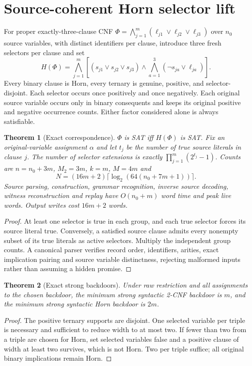 \documentclass[11pt]{article}
\newtheorem{theorem}{Theorem}
\begin{document}
\section{Source-coherent Horn selector lift}
For proper exactly-three-clause CNF $\Phi=\bigwedge_{j=1}^{m}(\ell_{j1}\vee\ell_{j2}\vee\ell_{j3})$ over $n_0$ source variables, with distinct identifiers per clause, introduce three fresh selectors per clause and set
\[
H(\Phi)=\bigwedge_{j=1}^{m}\left[
(s_{j1}\vee s_{j2}\vee s_{j3})\wedge
\bigwedge_{a=1}^{3}(\neg s_{ja}\vee\ell_{ja})\right].
\]
Every binary clause is Horn, every ternary is genuine, positive, and selector-disjoint. Each selector occurs once positively and once negatively. Each original source variable occurs only in binary consequents and keeps its original positive and negative occurrence counts. Either factor considered alone is always satisfiable.
\begin{theorem}[Exact correspondence]
$\Phi$ is SAT iff $H(\Phi)$ is SAT. Fix an original-variable assignment $\alpha$ and let $t_j$ be the number of true source literals in clause $j$. The number of selector extensions is exactly $\prod_{j=1}^{m}(2^{t_j}-1)$. Counts are $n=n_0+3m$, $M_2=3m$, $k=m$, $M=4m$ and
\[
N=(16m+2)\lceil\log_2(64(n_0+7m+1))\rceil.
\]
Source parsing, construction, grammar recognition, inverse source decoding, witness reconstruction and replay have $O(n_0+m)$ word time and peak live words. Output writes cost $16m+2$ words.
\end{theorem}
\begin{proof}
At least one selector is true in each group, and each true selector forces its source literal true. Conversely, a satisfied source clause admits every nonempty subset of its true literals as active selectors. Multiply the independent group counts. A canonical parser verifies record order, identifiers, arities, exact implication pairing and source variable distinctness, rejecting malformed inputs rather than assuming a hidden promise.
\end{proof}
\begin{theorem}[Exact strong backdoors]
Under raw restriction and all assignments to the chosen backdoor, the minimum strong syntactic 2-CNF backdoor is $m$, and the minimum strong syntactic Horn backdoor is $2m$.
\end{theorem}
\begin{proof}
The positive ternary supports are disjoint. One selected variable per triple is necessary and sufficient to reduce width to at most two. If fewer than two from a triple are chosen for Horn, set selected variables false and a positive clause of width at least two survives, which is not Horn. Two per triple suffice; all original binary implications remain Horn.
\end{proof}
\end{document}
